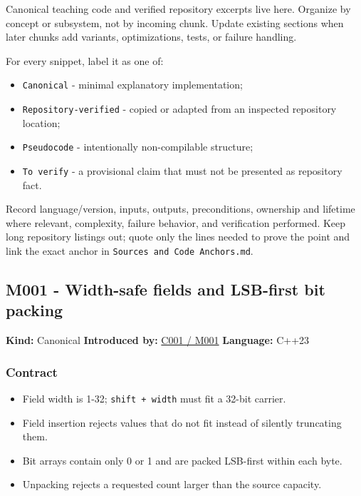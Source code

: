 Canonical teaching code and verified repository excerpts live here. Organize by concept or subsystem, not by incoming chunk. Update existing sections when later chunks add variants, optimizations, tests, or failure handling.

For every snippet, label it as one of:

\begin{itemize}
\tightlist
\item
  \texttt{Canonical} - minimal explanatory implementation;
\item
  \texttt{Repository-verified} - copied or adapted from an inspected repository location;
\item
  \texttt{Pseudocode} - intentionally non-compilable structure;
\item
  \texttt{To\ verify} - a provisional claim that must not be presented as repository fact.
\end{itemize}

Record language/version, inputs, outputs, preconditions, ownership and lifetime where relevant, complexity, failure behavior, and verification performed. Keep long repository listings out; quote only the lines needed to prove the point and link the exact anchor in \texttt{Sources\ and\ Code\ Anchors.md}.

\subsection{M001 - Width-safe fields and LSB-first bit packing}\label{appendix-4e2236f53445-m001---width-safe-fields-and-lsb-first-bit-packing}

\hypertarget{appendix-4e2236f53445-m001---width-safe-fields-and-lsb-first-bit-packing}{}

\textbf{Kind:} Canonical \textbf{Introduced by:} \hyperref[01-foundations-i-ch001-from-a-signal-to-an-interpretation]{C001 / M001} \textbf{Language:} C++23

\subsubsection{Contract}\label{appendix-4e2236f53445-contract}

\hypertarget{appendix-4e2236f53445-contract}{}

\begin{itemize}
\tightlist
\item
  Field width is 1-32; \texttt{shift\ +\ width} must fit a 32-bit carrier.
\item
  Field insertion rejects values that do not fit instead of silently truncating them.
\item
  Bit arrays contain only 0 or 1 and are packed LSB-first within each byte.
\item
  Unpacking rejects a requested count larger than the source capacity.
\end{itemize}


